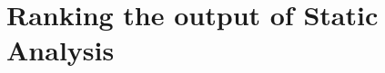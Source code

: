 \documentclass{article}
\begin{document}





\section{Ranking the output of Static Analysis}

\end{document}
